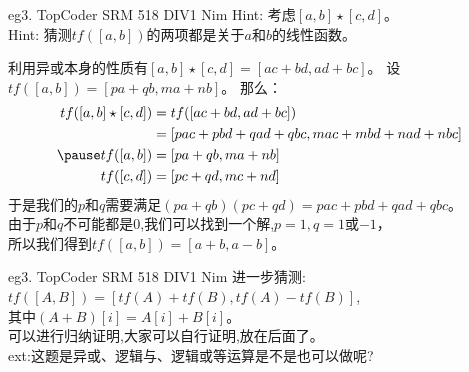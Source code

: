 \documentclass[allowframebreaks,10pt]{beamer}
\begin{document}
\begin{frame}{eg3. TopCoder SRM 518 DIV1 Nim}
Hint: 考虑$[a,b] \star [c,d]$。\\
Hint: 猜测$tf([a,b])$的两项都是关于$a$和$b$的线性函数。
\pause
\begin{solution}
利用异或本身的性质有$[a,b]\star[c,d]=[ac+bd,ad+bc]$。
\pause
设$tf([a,b])=[pa+qb,ma+nb]$。
那么：
\pause
\begin{equation*}
\begin{aligned}
tf([a,b] \star [c,d]) &= tf([ac+bd,ad+bc]) \\
	&= [pac+pbd+qad+qbc,mac+mbd+nad+nbc] \\
\pause
tf([a,b]) & = [pa+qb,ma+nb] \\
tf([c,d]) & = [pc+qd,mc+nd] 
\end{aligned}
\end{equation*}
\pause
于是我们的$p$和$q$需要满足$(pa+qb)(pc+qd)=pac+pbd+qad+qbc$。\\
由于$p$和$q$不可能都是0,我们可以找到一个解,$p=1,q=1$或$-1$，\\
\pause
所以我们得到$tf([a,b])=[a+b,a-b]$。
\end{solution}
\end{frame}
\begin{frame}{eg3. TopCoder SRM 518 DIV1 Nim}
进一步猜测:$tf([A,B])=[tf(A)+tf(B),tf(A)-tf(B)]$, \\ 
其中$(A+B)[i]=A[i]+B[i]$。 \\
\pause
可以进行归纳证明,大家可以自行证明,放在后面了。\\
ext:这题是异或、逻辑与、逻辑或等运算是不是也可以做呢?
\end{frame}
\end{document}
